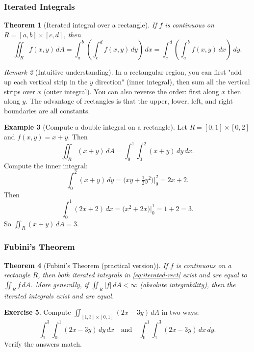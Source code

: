 \documentclass[12pt]{article}
\numberwithin{equation}{section}
\theoremstyle{plain}
\newtheorem{theorem}{Theorem}[section]
\theoremstyle{definition}
\newtheorem{example}[theorem]{Example}
\newtheorem{exercise}[theorem]{Exercise}
\theoremstyle{remark}
\newtheorem{remark}[theorem]{Remark}
\begin{document}
\subsubsection{Iterated Integrals}

\begin{theorem}[Iterated integral over a rectangle]\label{thm:iterated-rect}
If $f$ is continuous on $R=[a,b]\times[c,d]$, then
\begin{equation}\label{eq:iterated-rect}
\iint_R f(x,y)\,dA=\int_{a}^{b}\left(\int_{c}^{d} f(x,y)\,dy\right)\,dx
=\int_{c}^{d}\left(\int_{a}^{b} f(x,y)\,dx\right)\,dy.
\end{equation}
\end{theorem}

\begin{remark}[Intuitive understanding]
In a rectangular region, you can first "add up each vertical strip in the $y$ direction" (inner integral), then sum all the vertical strips over $x$ (outer integral).  
You can also reverse the order: first along $x$ then along $y$. The advantage of rectangles is that the upper, lower, left, and right boundaries are all constants.
\end{remark}

\begin{example}[Compute a double integral on a rectangle]
Let $R=[0,1]\times[0,2]$ and $f(x,y)=x+y$. Then
\[
\iint_R (x+y)\,dA=\int_{0}^{1}\int_{0}^{2}(x+y)\,dy\,dx.
\]
Compute the inner integral:
\[
\int_{0}^{2}(x+y)\,dy=\Big(xy+\tfrac12 y^2\Big)\Big|_{0}^{2}=2x+2.
\]
Then
\[
\int_{0}^{1}(2x+2)\,dx=\big(x^2+2x\big)\Big|_{0}^{1}=1+2=3.
\]
So $\iint_R (x+y)\,dA=3$.
\end{example}

\subsubsection{Fubini's Theorem}

\begin{theorem}[Fubini's Theorem (practical version)]\label{thm:fubini}
If $f$ is continuous on a rectangle $R$, then both iterated integrals in \cref{eq:iterated-rect} exist and are equal to $\iint_R f\,dA$.
More generally, if $\iint_R |f|\,dA<\infty$ (absolute integrability), then the iterated integrals exist and are equal.
\end{theorem}

\begin{exercise}
Compute $\iint_{[1,3]\times[0,1]} (2x-3y)\,dA$ in two ways:
\[
\int_{1}^{3}\int_{0}^{1}(2x-3y)\,dy\,dx
\quad\text{and}\quad
\int_{0}^{1}\int_{1}^{3}(2x-3y)\,dx\,dy.
\]
Verify the answers match.
\end{exercise}
\end{document}
